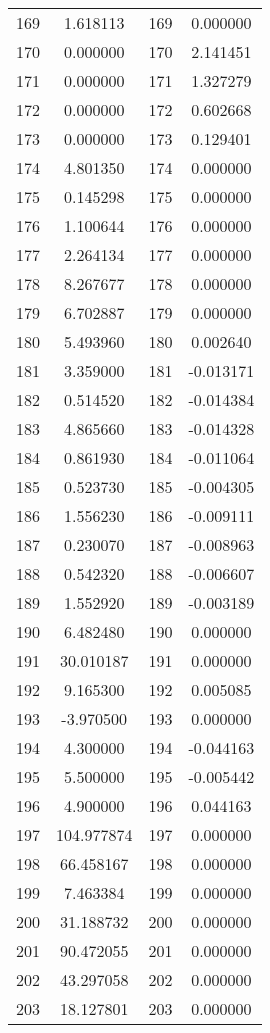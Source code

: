\documentclass[12pt]{article}
\begin{document}
\begin{longtable}{@{}cccc@{}}
169 & 1.618113 & 169 & 0.000000 \\
170 & 0.000000 & 170 & 2.141451 \\
171 & 0.000000 & 171 & 1.327279 \\
172 & 0.000000 & 172 & 0.602668 \\
173 & 0.000000 & 173 & 0.129401 \\
174 & 4.801350 & 174 & 0.000000 \\
175 & 0.145298 & 175 & 0.000000 \\
176 & 1.100644 & 176 & 0.000000 \\
177 & 2.264134 & 177 & 0.000000 \\
178 & 8.267677 & 178 & 0.000000 \\
179 & 6.702887 & 179 & 0.000000 \\
180 & 5.493960 & 180 & 0.002640 \\
181 & 3.359000 & 181 & -0.013171 \\
182 & 0.514520 & 182 & -0.014384 \\
183 & 4.865660 & 183 & -0.014328 \\
184 & 0.861930 & 184 & -0.011064 \\
185 & 0.523730 & 185 & -0.004305 \\
186 & 1.556230 & 186 & -0.009111 \\
187 & 0.230070 & 187 & -0.008963 \\
188 & 0.542320 & 188 & -0.006607 \\
189 & 1.552920 & 189 & -0.003189 \\
190 & 6.482480 & 190 & 0.000000 \\
191 & 30.010187 & 191 & 0.000000 \\
192 & 9.165300 & 192 & 0.005085 \\
193 & -3.970500 & 193 & 0.000000 \\
194 & 4.300000 & 194 & -0.044163 \\
195 & 5.500000 & 195 & -0.005442 \\
196 & 4.900000 & 196 & 0.044163 \\
197 & 104.977874 & 197 & 0.000000 \\
198 & 66.458167 & 198 & 0.000000 \\
199 & 7.463384 & 199 & 0.000000 \\
200 & 31.188732 & 200 & 0.000000 \\
201 & 90.472055 & 201 & 0.000000 \\
202 & 43.297058 & 202 & 0.000000 \\
203 & 18.127801 & 203 & 0.000000 \\

\end{longtable}
\end{document}
